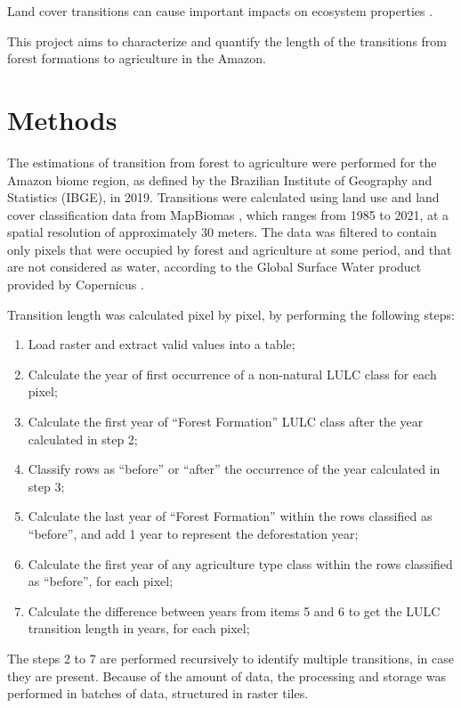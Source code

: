 \documentclass[essd, manuscript]{copernicus}
\begin{document}
Land cover transitions can cause important impacts on ecosystem properties \citep{Nunes2022}.

This project aims to characterize and quantify the length of the transitions from forest formations to agriculture in the Amazon.

\section{Methods}

The estimations of transition from forest to agriculture were performed for the Amazon biome region, as defined by the Brazilian Institute of Geography and Statistics (IBGE), in 2019.
Transitions were calculated using land use and land cover classification data from MapBiomas \citep{Souza2020}, which ranges from 1985 to 2021, at a spatial resolution of approximately 30 meters.
The data was filtered to contain only pixels that were occupied by forest and agriculture at some period, and that are not considered as water, according to the Global Surface Water product provided by Copernicus \citep{Pekel2016}.

Transition length was calculated pixel by pixel, by performing the following steps:

\begin{enumerate}
\def\labelenumi{\arabic{enumi}.}
\item
  Load raster and extract valid values into a table;
\item
  Calculate the year of first occurrence of a non-natural LULC class for each pixel;
\item
  Calculate the first year of ``Forest Formation'' LULC class after the year calculated in step 2;
\item
  Classify rows as ``before'' or ``after'' the occurrence of the year calculated in step 3;
\item
  Calculate the last year of ``Forest Formation'' within the rows classified as ``before'', and add 1 year to represent the deforestation year;
\item
  Calculate the first year of any agriculture type class within the rows classified as ``before'', for each pixel;
\item
  Calculate the difference between years from items 5 and 6 to get the LULC transition length in years, for each pixel;
\end{enumerate}

The steps 2 to 7 are performed recursively to identify multiple transitions, in case they are present.
Because of the amount of data, the processing and storage was performed in batches of data, structured in raster tiles.
\end{document}
